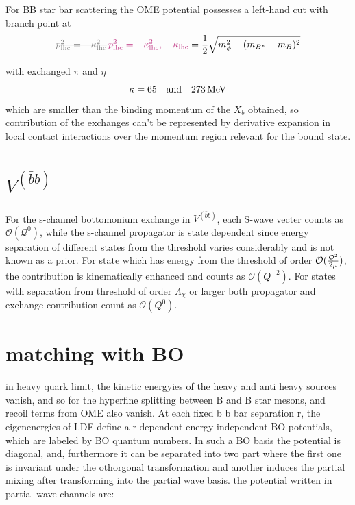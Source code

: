 \documentclass[11pt,a4paper]{article}
\renewcommand{\VQQ}{V^{(\bar bb)}}
\renewcommand{\MeV}{\,\mathrm{MeV}}
\newcommand{\aifixm}[2]{\textcolor{gray}{\text{\sout{$#1$}}}\,\textcolor{aicolor}{#2}}
\newcommand{\aifixm}[2]{#2}
\begin{document}
For BB star bar scattering the OME potential possesses a left-hand cut with branch point at
\[
	\aifixm{p_{\rm lhc}^2 = -\kappa^2_{\rm lhc}}{p_{\rm lhc}^2=-\kappa_{\rm lhc}^2,\quad\kappa_{\rm lhc}} = \frac{1}{2}\sqrt{m_\phi^2 - (m_{B^*}-m_B)^2}
\]

with exchanged $\pi$ and $\eta$ 
\[
	\kappa = 65\quad\rm{and}\quad 273 \MeV
\]
which are  smaller than the binding momentum of the $X_b$ obtained, so contribution of the exchanges can't be represented by derivative expansion in local contact interactions over the momentum region relevant for the bound state.

\section{$\VQQ$}
For the s-channel bottomonium exchange in $\VQQ$, each S-wave vecter counts as $\mathcal{O}(\mathcal{Q}^0)$, while the s-channel propagator is state dependent since energy separation of different states from the threshold varies considerably and is not known as a prior. For state which has energy from the threshold of order $\mathcal{O}({\mathcal{Q}^2\over 2\mu})$, the contribution is kinematically enhanced and counts as $\mathcal{O}(Q^{-2})$. For states with separation from threshold of order $\Lambda_\chi$ or larger both propagator and exchange contribution count as $\mathcal{O}(Q^{0})$.

\section{matching with BO}
\label{sec:pc-bo}
in heavy quark limit, the kinetic energyies of the heavy and anti heavy sources vanish, and so for the hyperfine splitting between B and B star mesons, and recoil terms from OME also vanish. At each fixed b b bar separation r, the eigenenergies of LDF define a r-dependent energy-independent BO potentials, which are labeled by BO quantum numbers. In such a BO basis the potential is diagonal, and, furthermore it can be separated into two part where the first one is invariant under the othorgonal transformation and another induces the partial mixing after transforming into the partial wave basis.
the potential written in partial wave channels are:
\end{document}
